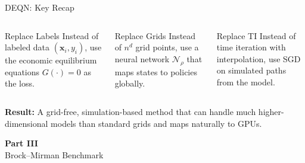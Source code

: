 \documentclass[aspectratio=169,11pt]{beamer}
\newcommand{\emphc}[1]{\textcolor{harvardcrimson}{#1}}
\newcommand{\x}{\bm{x}}
\begin{document}
\begin{frame}{DEQN: Key Recap}
\begin{columns}[T]
\begin{block}{Replace Labels}
\centering
\small
Instead of labeled data $(\x_i, y_i)$, use the economic equilibrium equations $G(\cdot) = 0$ as the loss.
\end{block}

\begin{block}{Replace Grids}
\centering
\small
Instead of $n^d$ grid points, use a neural network $\mathcal{N}_\rho$ that maps states to policies \emphc{globally}.
\end{block}

\begin{block}{Replace TI}
\centering
\small
Instead of time iteration with interpolation, use SGD on simulated paths from the model.
\end{block}
\end{columns}

\vspace{0.8em}
\begin{center}
\textbf{Result:} A grid-free, simulation-based method that can handle
much higher-dimensional models than standard grids and maps naturally to GPUs.
\end{center}
\end{frame}


\begin{frame}{}
\vfill
\begin{center}
{\Huge \textcolor{uzhblue}{\textbf{Part III}}}\\[12pt]
{\LARGE Brock--Mirman Benchmark}
\end{center}
\vfill
\end{frame}
\end{document}
